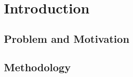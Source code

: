 \chapter{Introduction} %
\label{cha:Introduction}

\section{Problem and Motivation} %
\label{sec:Problem and Motivation}


\section{Methodology} %
\label{sec:Methodology}


